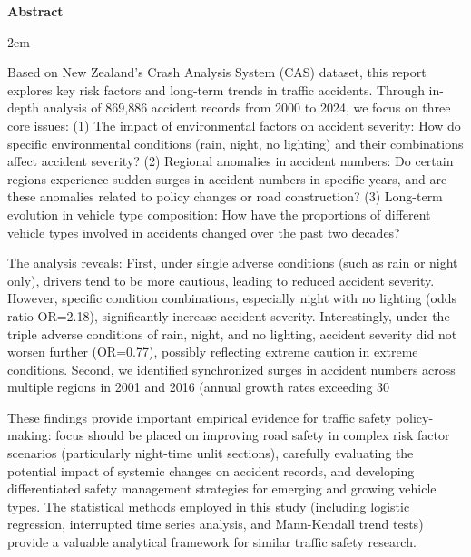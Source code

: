 \documentclass[12pt,a4paper]{article}
\newenvironment{enabstract}{
    \par\small
    \noindent\mbox{}\par\vspace{-\baselineskip}
    \par\parindent 2em
    }
    {\par\vspace{1em}}
\begin{document}
\begin{center}{\bfseries{Abstract}}\end{center}\par\vspace{0.5em}
\begin{enabstract}
Based on New Zealand's Crash Analysis System (CAS) dataset, this report explores key risk factors and long-term trends in traffic accidents. Through in-depth analysis of 869,886 accident records from 2000 to 2024, we focus on three core issues: (1) The impact of environmental factors on accident severity: How do specific environmental conditions (rain, night, no lighting) and their combinations affect accident severity? (2) Regional anomalies in accident numbers: Do certain regions experience sudden surges in accident numbers in specific years, and are these anomalies related to policy changes or road construction? (3) Long-term evolution in vehicle type composition: How have the proportions of different vehicle types involved in accidents changed over the past two decades?

The analysis reveals: First, under single adverse conditions (such as rain or night only), drivers tend to be more cautious, leading to reduced accident severity. However, specific condition combinations, especially night with no lighting (odds ratio OR=2.18), significantly increase accident severity. Interestingly, under the triple adverse conditions of rain, night, and no lighting, accident severity did not worsen further (OR=0.77), possibly reflecting extreme caution in extreme conditions. Second, we identified synchronized surges in accident numbers across multiple regions in 2001 and 2016 (annual growth rates exceeding 30%

These findings provide important empirical evidence for traffic safety policy-making: focus should be placed on improving road safety in complex risk factor scenarios (particularly night-time unlit sections), carefully evaluating the potential impact of systemic changes on accident records, and developing differentiated safety management strategies for emerging and growing vehicle types. The statistical methods employed in this study (including logistic regression, interrupted time series analysis, and Mann-Kendall trend tests) provide a valuable analytical framework for similar traffic safety research.


\end{enabstract}
\end{document}
